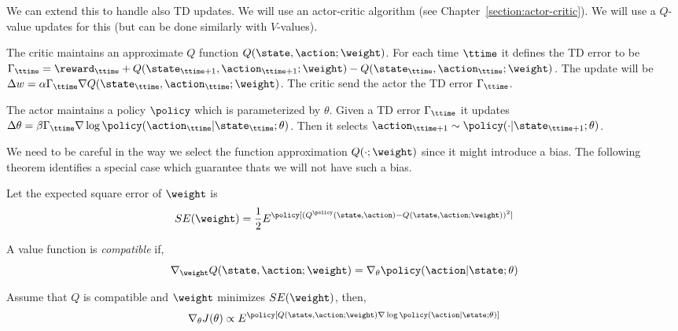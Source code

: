 We can extend this to handle also TD updates. We will use an
actor-critic algorithm (see Chapter~\ref{section:actor-critic}). We will use a $Q$-value updates for this
(but can be done similarly with $V$-values).

The critic maintains an approximate $Q$ function $Q(\state,\action;\weight)$. For each time $\ttime$ it defines the TD error to be $\Gamma_\ttime = \reward_\ttime +Q(\state_{\ttime+1},\action_{\ttime+1};\weight)-Q(\state_\ttime,\action_\ttime;\weight)$. The update will be $\Delta w=\alpha\Gamma_\ttime \nabla Q(\state_\ttime,\action_\ttime;\weight)$. The critic send the actor the TD error $\Gamma_\ttime$.

The actor maintains a policy $\policy$ which is parameterized by $\theta$. Given a TD error $\Gamma_\ttime$ it updates $\Delta \theta= \beta \Gamma_\ttime \nabla \log \policy(\action_\ttime|\state_\ttime;\theta)$. Then it selects $\action_{\ttime+1}\sim \policy(\cdot|\state_{\ttime+1};\theta)$.

We need to be careful in the way we select the function
approximation $Q(\cdot;\weight)$ since it might introduce a bias.
The following theorem identifies a special case which guarantee
thats we will not have such a bias.

Let the expected square error of $\weight$ is
\[
SE(\weight)=\frac{1}{2}E^\policy[(Q^\policy(\state,\action)-Q(\state,\action;\weight))^2]
\]

A value function is {\em compatible} if,
\[
\nabla_\weight Q(\state,\action;\weight)= \nabla_\theta
\policy(\action|\state;\theta)
\]


\begin{theorem}
Assume that $Q$ is compatible and $\weight$ minimizes $SE(\weight)$,
then,
\[
\nabla_\theta J(\theta)\propto E^\policy[Q(\state,\action;\weight)
\nabla \log \policy(\action|\state;\theta)]
\]
\end{theorem}

